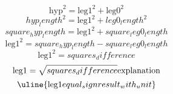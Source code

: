 \[\text{{{hyp}}}^{{2}}=\text{{{leg1}}}^{{2}}+\text{{{leg0}}}^{{2}}\]
\[{hyp_length}^{{2}}=\text{{{leg1}}}^{{2}}+{leg0_length}^{{2}}\]
\[{square_hyp_length}=\text{{{leg1}}}^{{2}}+{square_leg0_length}\]
\[\text{{{leg1}}}^{{2}}={square_hyp_length}-{square_leg0_length}\]
\[\text{{{leg1}}}^{{2}}={squares_difference}\]
\[\text{{{leg1}}}=\sqrt{{\mathstrut {squares_difference}}}\text{{{explanation}}}\]
\[\uline{{\text{{{leg1}}}{equal_sign}{result_with_unit}}}\]